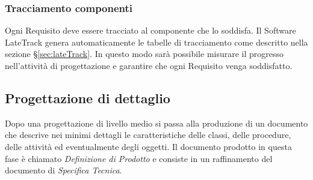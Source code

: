 	\subsubsection{Tracciamento componenti}
	Ogni Requisito deve essere tracciato al componente che lo soddisfa. Il Software LateTrack genera automaticamente le tabelle di tracciamento come descritto nella sezione \S\ref{sec:lateTrack}. In questo modo sarà possibile misurare il progresso nell'attività di progettazione e garantire che ogni Requisito venga soddisfatto.
	\subsection{Progettazione di dettaglio}
	
	Dopo una progettazione di livello medio si passa alla produzione di un documento che descrive nei minimi dettagli le caratteristiche delle classi, delle procedure, delle attività ed eventualmente degli oggetti. Il documento prodotto in questa fase è
	chiamato \emph{Definizione di Prodotto} e consiste in un raffinamento del documento di	\emph{Specifica Tecnica}.
